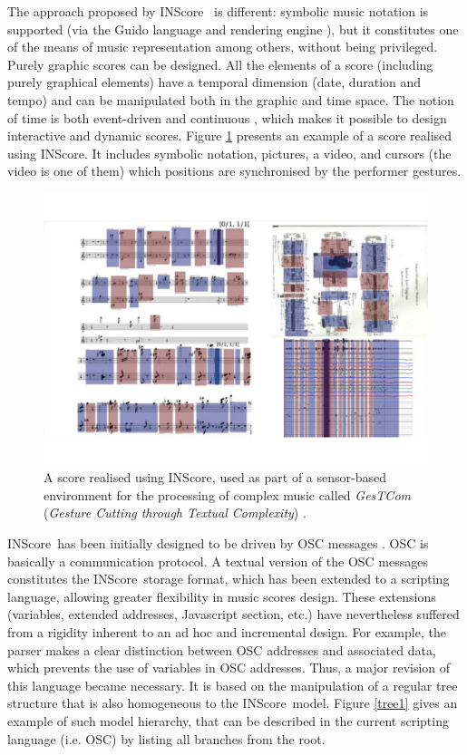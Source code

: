 \documentclass[runningheads]{llncs}
\newcommand{\IS}		{INScore}
\begin{document}
The approach proposed by \IS\ \cite{Fober:12a} is different: symbolic music notation is supported (via the Guido language and rendering engine \cite{Dau:09b,hoos98}), but it constitutes one of the means of music representation among others, without being privileged. 
Purely graphic scores can be designed. All the elements of a score (including purely graphical elements) have a temporal dimension (date, duration and tempo) and can be manipulated both in the graphic and time space. The notion of time is both event-driven and continuous \cite{fober17c}, which makes it possible to design interactive and dynamic scores. Figure \ref{pavlos} presents an example of a score realised using \IS . It includes symbolic notation, pictures, a video, and cursors (the video is one of them) which positions are synchronised by the performer gestures.

\begin{figure}
\begin{center}
\includegraphics[width=0.64\columnwidth]{imgs/inscore-score}
\caption{A score realised using \IS , used as part of a sensor-based environment for the processing of complex music called \emph{GesTCom} (\emph{Gesture Cutting through Textual Complexity}) \cite{antoniadis:tel-01861171}.}
\label{pavlos}
\end{center}
\end{figure}

\IS\ has been initially designed to be driven by OSC messages \cite{OSC}. OSC is basically a communication protocol. A textual version of the OSC messages constitutes the \IS\ storage format, which has been extended to a scripting language, \cite{Fober:13b} allowing greater flexibility in music scores design.
These extensions (variables, extended addresses, Javascript section, etc.) have nevertheless suffered from a rigidity inherent to an ad hoc and incremental design. For example, the parser makes a clear distinction between OSC addresses and associated data, which prevents the use of variables in OSC addresses.
Thus, a major revision of this language became necessary. It is based on the manipulation of a regular tree structure that is also homogeneous to the \IS\ model.
Figure \ref{tree1} gives an example of such model hierarchy, that can be described in the current scripting language (i.e. OSC) by listing all branches from the root. %
\end{document}
